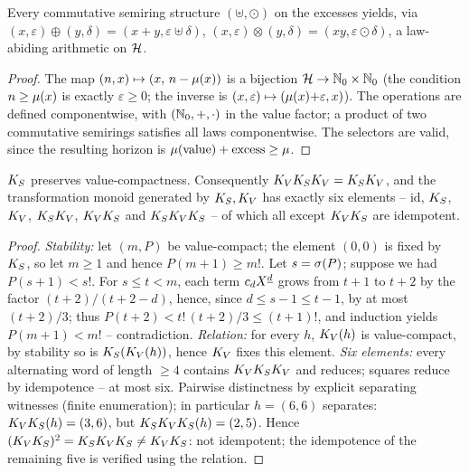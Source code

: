 \begin{satz}
Every commutative semiring structure $(\uplus,\odot)$ on the
excesses yields, via
$(x,\varepsilon)\oplus(y,\delta)=(x{+}y,\varepsilon\uplus\delta)$,
$(x,\varepsilon)\otimes(y,\delta)=(xy,\varepsilon\odot\delta)$,
a law-abiding arithmetic on $\mathcal H$.
\end{satz}

\begin{proof}
The map $(n,x)\mapsto(x,\,n-\mu(x))$ is a bijection
$\mathcal H\to\mathbb N_0\times\mathbb N_0$ (the condition $n\ge\mu(x)$ is exactly
$\varepsilon\ge0$; the inverse is
$(x,\varepsilon)\mapsto(\mu(x){+}\varepsilon,x)$). The operations
are defined componentwise, with $(\mathbb N_0,+,\cdot)$ in the value
factor; a product of two commutative semirings satisfies all laws
componentwise. The selectors are valid, since the resulting
horizon is $\mu(\text{value})+\text{excess}\ge\mu$.
\end{proof}

\begin{satz}
$K_S$ preserves value-compactness. Consequently
$K_VK_SK_V=K_SK_V$, and the transformation monoid generated by
$K_S,K_V$ has exactly six elements -- $\mathrm{id}$,
$K_S$, $K_V$, $K_SK_V$, $K_VK_S$ and $K_SK_VK_S$ -- of which
all except $K_VK_S$ are idempotent.
\end{satz}

\begin{proof}
\emph{Stability:} let $(m,P)$ be value-compact; the element
$(0,0)$ is fixed by $K_S$, so let $m\ge1$ and hence
$P(m{+}1)\ge m!$. Let $s=\sigma(P)$; suppose we had
$P(s{+}1)<s!$. For $s\le t<m$, each term $c_dX^{\underline{d}}$ grows from
$t{+}1$ to $t{+}2$ by the factor $(t{+}2)/(t{+}2{-}d)$, hence,
since $d\le s{-}1\le t{-}1$, by at most $(t{+}2)/3$; thus
$P(t{+}2)<t!\,(t{+}2)/3\le(t{+}1)!$, and induction yields
$P(m{+}1)<m!$ -- contradiction.
\emph{Relation:} for every $h$, $K_V(h)$ is value-compact, by
stability so is $K_S(K_V(h))$, hence $K_V$ fixes this element.
\emph{Six elements:} every alternating word of length $\ge4$
contains $K_VK_SK_V$ and reduces; squares reduce by idempotence
-- at most six. Pairwise distinctness by explicit separating
witnesses (finite enumeration); in particular $h=(6,6)$
separates: $K_VK_S(h)=(3,6)$, but $K_SK_VK_S(h)=(2,5)$. Hence
$(K_VK_S)^2=K_SK_VK_S\ne K_VK_S$: not idempotent; the idempotence
of the remaining five is verified using the relation.
\end{proof}

